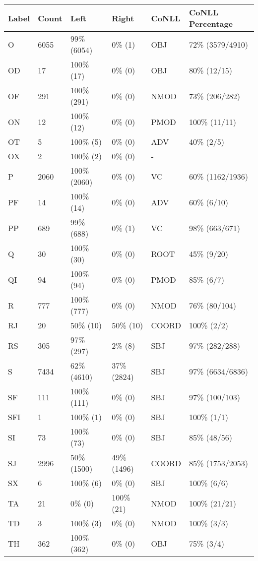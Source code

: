 \begin{figure*}
\begin{tabular}{|l|l|l|l||l|l|}
\hline
Label & Count & Left & Right & CoNLL & CoNLL Percentage\\ 
\hline
 O & 6055 & 99\% (6054) & 0\% (1) & OBJ & 72\% (3579/4910) \\ 
\hline
 OD & 17 & 100\% (17) & 0\% (0) & OBJ & 80\% (12/15) \\ 
\hline
 OF & 291 & 100\% (291) & 0\% (0) & NMOD & 73\% (206/282) \\ 
\hline
 ON & 12 & 100\% (12) & 0\% (0) & PMOD & 100\% (11/11) \\ 
\hline
 OT & 5 & 100\% (5) & 0\% (0) & ADV & 40\% (2/5) \\ 
\hline
 OX & 2 & 100\% (2) & 0\% (0) & - &  \\ 
\hline
 P & 2060 & 100\% (2060) & 0\% (0) & VC & 60\% (1162/1936) \\ 
\hline
 PF & 14 & 100\% (14) & 0\% (0) & ADV & 60\% (6/10) \\ 
\hline
 PP & 689 & 99\% (688) & 0\% (1) & VC & 98\% (663/671) \\ 
\hline
 Q & 30 & 100\% (30) & 0\% (0) & ROOT & 45\% (9/20) \\ 
\hline
 QI & 94 & 100\% (94) & 0\% (0) & PMOD & 85\% (6/7) \\ 
\hline
 R & 777 & 100\% (777) & 0\% (0) & NMOD & 76\% (80/104) \\ 
\hline
 RJ & 20 & 50\% (10) & 50\% (10) & COORD & 100\% (2/2) \\ 
\hline
 RS & 305 & 97\% (297) & 2\% (8) & SBJ & 97\% (282/288) \\ 
\hline
 S & 7434 & 62\% (4610) & 37\% (2824) & SBJ & 97\% (6634/6836) \\ 
\hline
 SF & 111 & 100\% (111) & 0\% (0) & SBJ & 97\% (100/103) \\ 
\hline
 SFI & 1 & 100\% (1) & 0\% (0) & SBJ & 100\% (1/1) \\ 
\hline
 SI & 73 & 100\% (73) & 0\% (0) & SBJ & 85\% (48/56) \\ 
\hline
 SJ & 2996 & 50\% (1500) & 49\% (1496) & COORD & 85\% (1753/2053) \\ 
\hline
 SX & 6 & 100\% (6) & 0\% (0) & SBJ & 100\% (6/6) \\ 
\hline
 TA & 21 & 0\% (0) & 100\% (21) & NMOD & 100\% (21/21) \\ 
\hline
 TD & 3 & 100\% (3) & 0\% (0) & NMOD & 100\% (3/3) \\ 
\hline
 TH & 362 & 100\% (362) & 0\% (0) & OBJ & 75\% (3/4) \\ 

\end{tabular}
\end{figure*}
